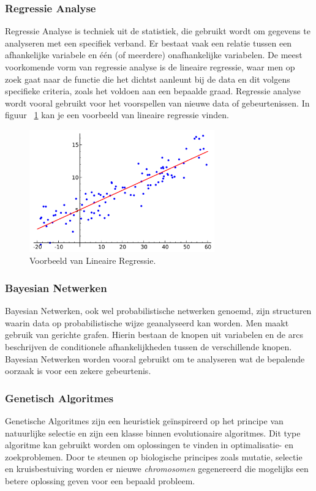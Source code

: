 			
	\subsubsection{Regressie Analyse}
	Regressie Analyse is techniek uit de statistiek, die gebruikt wordt om gegevens te analyseren met een specifiek verband. Er bestaat vaak een relatie tussen een afhankelijke variabele en \'e\'en (of meerdere) onafhankelijke variabelen. De meest voorkomende vorm van regressie analyse is de lineaire regressie, waar men op zoek gaat naar de functie die het dichtst aanleunt bij de data en dit volgens specifieke criteria, zoals het voldoen aan een bepaalde graad. Regressie analyse wordt vooral gebruikt voor het voorspellen van nieuwe data of gebeurtenissen. In figuur ~\ref{fig:regressieAnalyse} kan je een voorbeeld van lineaire regressie vinden.
	\begin{figure}
		\centering
		\includegraphics[width=80mm]{afbeeldingen/regressieAnalyse.PNG}
		\caption{Voorbeeld van Lineaire Regressie.\citep{bron:regressieanalyse} }
		\label{fig:regressieAnalyse}
		
	\end{figure}
	
	
	\subsubsection{Bayesian Netwerken}
	Bayesian Netwerken, ook wel probabilistische netwerken genoemd, zijn structuren waarin data op probabilistische wijze geanalyseerd kan worden. Men maakt gebruik van gerichte grafen. Hierin bestaan de knopen uit variabelen en de arcs beschrijven de conditionele afhankelijkheden tussen de verschillende knopen. Bayesian Netwerken worden vooral gebruikt om te analyseren wat de bepalende oorzaak is voor een zekere gebeurtenis. 
	
	\subsubsection{Genetisch Algoritmes}
	Genetische Algoritmes zijn een heuristiek ge\"inspireerd op het principe van natuurlijke selectie en zijn een klasse binnen evolutionaire algoritmes. Dit type algoritme kan gebruikt worden om oplossingen te vinden in optimalisatie- en zoekproblemen. Door te steunen op biologische principes zoals mutatie, selectie en kruisbestuiving worden er nieuwe \textit{chromosomen} gegenereerd die mogelijks een betere oplossing geven voor een bepaald probleem.
	
